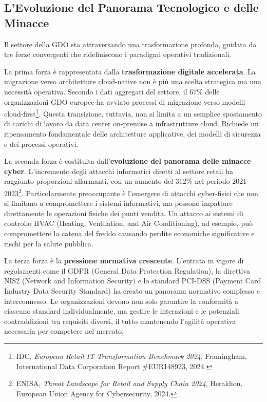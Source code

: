 \begin{bibunit}[IEEEtran]
\subsection{L'Evoluzione del Panorama Tecnologico e delle Minacce}

Il settore della GDO sta attraversando una trasformazione profonda, guidata da tre forze convergenti che ridefiniscono i paradigmi operativi tradizionali.

La prima forza è rappresentata dalla \textbf{trasformazione digitale accelerata}. La migrazione verso architetture cloud-native non è più una scelta strategica ma una necessità operativa. Secondo i dati aggregati del settore, il 67\% delle organizzazioni GDO europee ha avviato processi di migrazione verso modelli cloud-first\footnote{IDC, \textit{European Retail IT Transformation Benchmark 2024}, Framingham, International Data Corporation Report \#EUR148923, 2024.}. Questa transizione, tuttavia, non si limita a un semplice spostamento di carichi di lavoro da data center on-premise a infrastrutture cloud. Richiede un ripensamento fondamentale delle architetture applicative, dei modelli di sicurezza e dei processi operativi.

La seconda forza è costituita dall'\textbf{evoluzione del panorama delle minacce cyber}. L'incremento degli attacchi informatici diretti al settore retail ha raggiunto proporzioni allarmanti, con un aumento del 312\% nel periodo 2021-2023\footnote{ENISA, \textit{Threat Landscape for Retail and Supply Chain 2024}, Heraklion, European Union Agency for Cybersecurity, 2024.}. Particolarmente preoccupante è l'emergere di attacchi cyber-fisici che non si limitano a compromettere i sistemi informativi, ma possono impattare direttamente le operazioni fisiche dei punti vendita. Un attacco ai sistemi di controllo HVAC (Heating, Ventilation, and Air Conditioning), ad esempio, può compromettere la catena del freddo causando perdite economiche significative e rischi per la salute pubblica.

La terza forza è la \textbf{pressione normativa crescente}. L'entrata in vigore di regolamenti come il GDPR (General Data Protection Regulation), la direttiva NIS2 (Network and Information Security) e lo standard PCI-DSS (Payment Card Industry Data Security Standard) ha creato un panorama normativo complesso e interconnesso. Le organizzazioni devono non solo garantire la conformità a ciascuno standard individualmente, ma gestire le interazioni e le potenziali contraddizioni tra requisiti diversi, il tutto mantenendo l'agilità operativa necessaria per competere nel mercato.


\end{bibunit}
